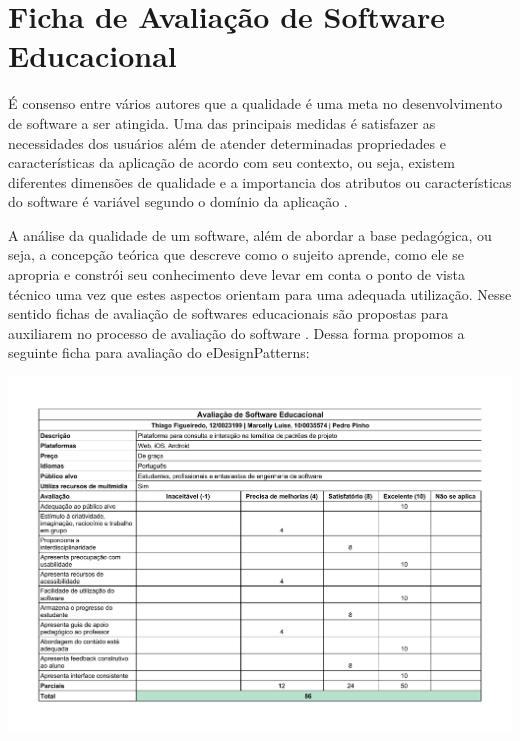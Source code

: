 \section{Ficha de Avaliação de Software Educacional}

É consenso entre vários autores que a qualidade é uma meta no desenvolvimento de software a ser atingida. Uma das principais medidas é satisfazer
 as necessidades dos usuários além de atender determinadas propriedades e características da aplicação de acordo com seu contexto, ou seja,
 existem diferentes dimensões de qualidade e a importancia dos atributos ou características do software é variável segundo o domínio da aplicação \cite{rocha2008avaliaccao}.
 
A análise da qualidade de um software, além de abordar a base pedagógica, ou seja, a concepção teórica que descreve como o sujeito aprende, como ele se apropria e constrói seu
conhecimento deve levar em conta o ponto de vista técnico uma vez que estes aspectos orientam para uma adequada utilização. Nesse sentido fichas de avaliação de softwares
educacionais são propostas para auxiliarem no processo de avaliação do software \cite{vieira1999avaliaccao}. Dessa forma propomos a seguinte ficha para avaliação do eDesignPatterns:

\hspace*{-1.5in}
\includegraphics[width=630px]{fichaavaliacao.pdf}

